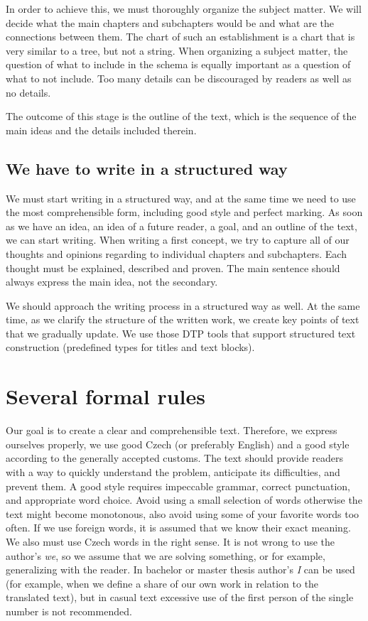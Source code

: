 In order to achieve this, we must thoroughly organize the subject matter. We will decide what the main chapters and subchapters would be and what are the connections between them. The chart of such an establishment is a chart that is very similar to a tree, but not a string. When organizing a subject matter, the question of what to include in the schema is equally important as a question of what to not include. Too many details can be discouraged by readers as well as no details.

The outcome of this stage is the outline of the text, which is the sequence of the main ideas and the details included therein.

\section{We have to write in a structured way} 
We must start writing in a structured way, and at the same time we need to use the most comprehensible form, including good style and perfect marking. 
As soon as we have an idea, an idea of a future reader, a goal, and an outline of the text, we can start writing. When writing a first concept, we try to capture all of our thoughts and opinions regarding to individual chapters and subchapters. Each thought must be explained, described and proven. The main sentence should always express the main idea, not the secondary.

We should approach the writing process in a structured way as well. At the same time, as we clarify the structure of the written work, we create key points of text that we gradually update. We use those DTP tools that support structured text construction (predefined types for titles and text blocks). 


\chapter{Several formal rules}
Our goal is to create a clear and comprehensible text. Therefore, we express ourselves properly, we use good Czech (or preferably English) and a good style according to the generally accepted customs. The text should provide readers with a way to quickly understand the problem, anticipate its difficulties, and prevent them. A good style requires impeccable grammar, correct punctuation, and appropriate word choice. Avoid using a small selection of words otherwise the text might become monotonous, also avoid using some of your favorite words too often. If we use foreign words, it is assumed that we know their exact meaning. We also must use Czech words in the right sense. It is not wrong to use the author's {\it we}, so we assume that we are solving something, or for example, generalizing with the reader. In bachelor or master thesis author's {\it I} can be used (for example, when we define a share of our own work in relation to the translated text), but in casual text excessive use of the first person of the single number is not recommended.

